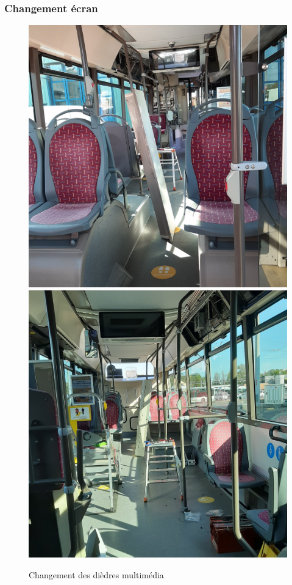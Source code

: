\documentclass{article}
\begin{document}
        \subsubsection{Changement écran}
            \label{Ecran}
            \begin{figure}[!h]
                \centering
                \includegraphics[scale = 0.1]{Images/multimedia.jpg}
                \includegraphics[scale = 0.1]{Images/multimedia2.jpg}
                \caption{Changement des dièdres multimédia}
            \end{figure}
\end{document}
